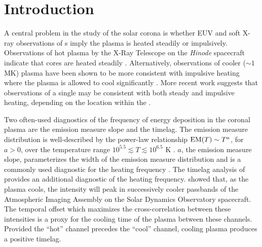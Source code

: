 \section{Introduction}\label{sec:introduction}

A central problem in the study of the solar corona is whether EUV and soft X-ray observations of \AR s imply the plasma is heated steadily or impulsively. Observations of hot plasma by the X-Ray Telescope \citep[XRT,][]{golub_x-ray_2007} on the \textit{Hinode} spacecraft \citep{kosugi_hinode_2007} indicate that \AR{} cores are heated steadily \citep[e.g.][]{warren_constraints_2011,winebarger_using_2011}. Alternatively, observations of cooler ($\sim1$ MK) plasma have been shown to be more consistent with impulsive heating where the plasma is allowed to cool significantly \citep[e.g]{winebarger_evolving_2003,mulu-moore_determining_2011,ugarte-urra_investigation_2006,viall_patterns_2011,viall_evidence_2012}. More recent work \citep{del_zanna_evolution_2015,bradshaw_patterns_2016} suggests that observations of a single \AR{} may be consistent with both steady and impulsive heating, depending on the location within the \AR{}. 

Two often-used diagnostics of the frequency of energy deposition in the coronal plasma are the emission measure slope and the timelag. The emission measure distribution is well-described by the power-law relationship $\textup{EM}(T)\sim T^a$, for $a>0$, over the temperature range $10^{5.5}\lesssim T\lesssim10^{6.5}$ K \citep{jordan_structure_1975,jordan_structure_1976}. $a$, the emission measure slope, parameterizes the width of the emission measure distribution and is a commonly used diagnostic for the heating frequency \citep[e.g.][]{tripathi_emission_2011,winebarger_using_2011,warren_constraints_2011,mulu-moore_can_2011,bradshaw_diagnosing_2012,schmelz_cold_2012,reep_diagnosing_2013,del_zanna_evolution_2015}. The timelag analysis of \citet{viall_evidence_2012} provides an additional diagnostic of the heating frequency. \citep{viall_patterns_2011} showed that, as the plasma cools, the intensity will peak in successively cooler passbands of the Atmospheric Imaging Assembly \citep[AIA,][]{lemen_atmospheric_2012} on the Solar Dynamics Observatory \citep[SDO,][]{pesnell_solar_2012} spacecraft. The temporal offset which maximizes the cross-correlation between these intensities is a proxy for the cooling time of the plasma between these channels. Provided the ``hot'' channel precedes the ``cool'' channel, cooling plasma produces a positive timelag.

